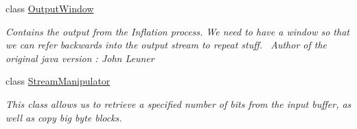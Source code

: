 \begin{DoxyCompactItemize}
class \hyperlink{class_i_c_sharp_code_1_1_sharp_zip_lib_1_1_zip_1_1_compression_1_1_streams_1_1_output_window}{Output\+Window}
\begin{DoxyCompactList}\small\item\em Contains the output from the Inflation process. We need to have a window so that we can refer backwards into the output stream to repeat stuff.~\newline
 Author of the original java version \+: John Leuner \end{DoxyCompactList}\item 
class \hyperlink{class_i_c_sharp_code_1_1_sharp_zip_lib_1_1_zip_1_1_compression_1_1_streams_1_1_stream_manipulator}{Stream\+Manipulator}
\begin{DoxyCompactList}\small\item\em This class allows us to retrieve a specified number of bits from the input buffer, as well as copy big byte blocks. \end{DoxyCompactList}\end{DoxyCompactItemize}
